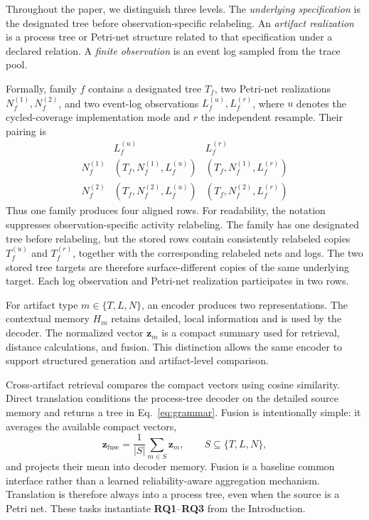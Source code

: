 \documentclass[pdflatex,sn-basic]{sn-jnl}
\newcommand{\RQone}{\textbf{RQ1}}
\newcommand{\RQthree}{\textbf{RQ3}}
\newcommand{\vect}[1]{\boldsymbol{#1}}
\begin{document}
Throughout the paper, we distinguish three levels. The \emph{underlying specification} is the designated tree before observation-specific relabeling. An \emph{artifact realization} is a process tree or Petri-net structure related to that specification under a declared relation. A \emph{finite observation} is an event log sampled from the trace pool.

Formally, family $f$ contains a designated tree $T_f$, two Petri-net realizations $N_f^{(1)},N_f^{(2)}$, and two event-log observations $L_f^{(u)},L_f^{(r)}$, where $u$ denotes the cycled-coverage implementation mode and $r$ the independent resample. Their pairing is
\[
\begin{array}{c|cc}
 & L_f^{(u)} & L_f^{(r)}\\
\hline
N_f^{(1)} & (T_f,N_f^{(1)},L_f^{(u)}) & (T_f,N_f^{(1)},L_f^{(r)})\\
N_f^{(2)} & (T_f,N_f^{(2)},L_f^{(u)}) & (T_f,N_f^{(2)},L_f^{(r)})
\end{array}
\]
Thus one family produces four aligned rows. For readability, the notation suppresses observation-specific activity relabeling. The family has one designated tree before relabeling, but the stored rows contain consistently relabeled copies $T_f^{(u)}$ and $T_f^{(r)}$, together with the corresponding relabeled nets and logs. The two stored tree targets are therefore surface-different copies of the same underlying target. Each log observation and Petri-net realization participates in two rows.

For artifact type $m\in\{T,L,N\}$, an encoder produces two representations. The contextual memory $H_m$ retains detailed, local information and is used by the decoder. The normalized vector $\vect z_m$ is a compact summary used for retrieval, distance calculations, and fusion. This distinction allows the same encoder to support structured generation and artifact-level comparison.

Cross-artifact retrieval compares the compact vectors using cosine similarity. Direct translation conditions the process-tree decoder on the detailed source memory and returns a tree in Eq.~\eqref{eq:grammar}. Fusion is intentionally simple: it averages the available compact vectors,
\begin{equation}
\vect z_{\mathrm{fuse}}=\frac{1}{|S|}\sum_{m\in S}\vect z_m,
\qquad S\subseteq\{T,L,N\},
\label{eq:fusion}
\end{equation}
and projects their mean into decoder memory. Fusion is a baseline common interface rather than a learned reliability-aware aggregation mechanism. Translation is therefore always into a process tree, even when the source is a Petri net. These tasks instantiate \RQone--\RQthree{} from the Introduction.
\end{document}
